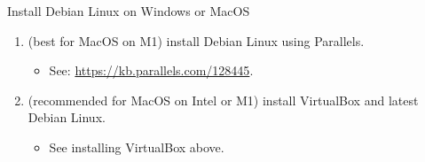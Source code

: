 \begin{frame}{Install Debian Linux on Windows or MacOS}
\begin{enumerate}
    \item[Or] (best for \textcolor{fh-ooe-red}{MacOS} on M1) install Debian Linux using \textcolor{fh-ooe-red}{Parallels}.
    \begin{itemize}
      \item See: \textcolor{fh-ooe-red}{\href{https://kb.parallels.com/128445}{https://kb.parallels.com/128445}}.
    \end{itemize}
    \item[Or] (recommended for \textcolor{fh-ooe-red}{MacOS} on Intel or M1) install \textcolor{fh-ooe-red}{VirtualBox} and latest Debian Linux.
    \begin{itemize}
      \item See installing \textcolor{fh-ooe-red}{VirtualBox} above.
    \end{itemize}
  \end{enumerate}
\end{frame}
